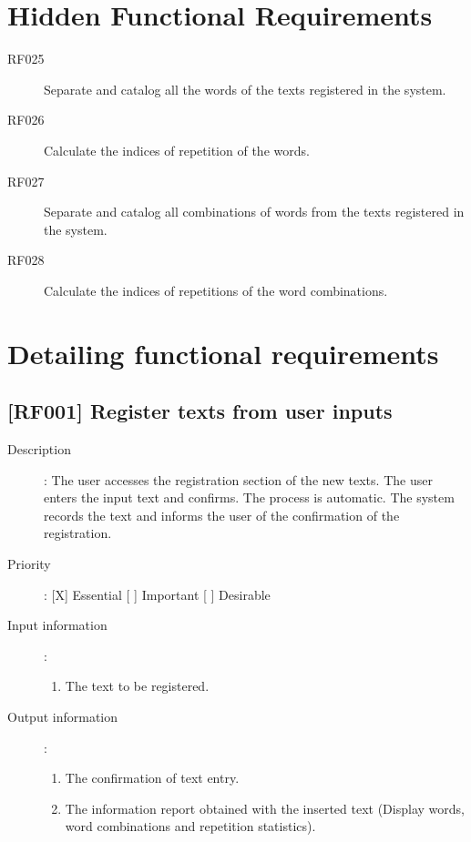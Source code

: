 \documentclass[11pt, twoside, a4paper]{book}
\begin{document}
		\section{Hidden Functional Requirements}
			
			\begin{description}

				\item[RF025] Separate and catalog all the words of the texts registered in the system.
				\item[RF026] Calculate the indices of repetition of the words.
				\item[RF027] Separate and catalog all combinations of words from the texts registered in the system.
				\item[RF028] Calculate the indices of repetitions of the word combinations.

			\end{description}
		
		\section{Detailing functional requirements}
			
			\subsection{[RF001] Register texts from user inputs}
				
				\begin{description}
				
					\item[Description]: The user accesses the registration section of the new texts. The user enters the input text and confirms. The process is automatic. The system records the text and informs the user of the confirmation of the registration.	
					\item[Priority]: [X] Essential [ ] Important [ ] Desirable
					\item[Input information]:
						\begin{enumerate}
						
							\item The text to be registered.
							
						\end{enumerate}
					\item[Output information]:
						\begin{enumerate}
						
							\item The confirmation of text entry.
							\item The information report obtained with the inserted text (Display words, word combinations and repetition statistics).
														
						\end{enumerate}
	
				\end{description}
\end{document}
